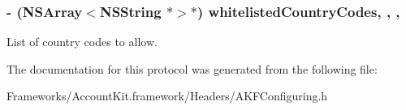 \subsubsection[{whitelisted\+Country\+Codes}]{\setlength{\rightskip}{0pt plus 5cm}-\/ (N\+S\+Array$<$N\+S\+String $\ast$$>$$\ast$) whitelisted\+Country\+Codes\hspace{0.3cm}{\ttfamily [read]}, {\ttfamily [write]}, {\ttfamily [nonatomic]}, {\ttfamily [copy]}}\label{protocol_a_k_f_configuring-p_af865e3330eb55455b067b14de0ff27fd}
List of country codes to allow. 

The documentation for this protocol was generated from the following file\+:\begin{DoxyCompactItemize}
\item 
Frameworks/\+Account\+Kit.\+framework/\+Headers/A\+K\+F\+Configuring.\+h\end{DoxyCompactItemize}
